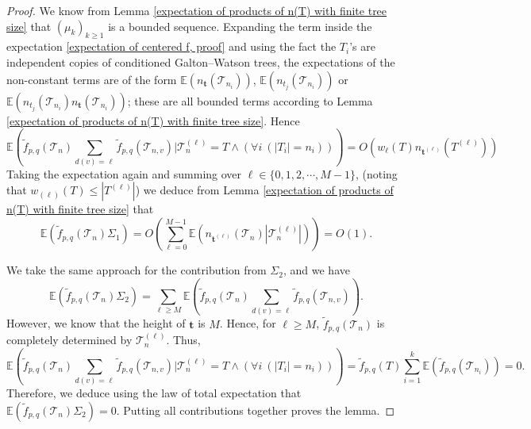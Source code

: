 \documentclass[10pt,a4paper]{amsart}
\newcommand{\E}{\mathbb{E}}
\newcommand{\hf}{\tilde{f}_{p,q}}
\newcommand{\n}{n_{\st}}
\newcommand{\st}{\textbf{t}}
\newcommand{\tc}{\mathcal{T}}
\begin{document}
\begin{proof}
We know from Lemma \ref{expectation of products of n(T) with finite tree size} that $(\mu_k)_{k\geq 1}$ is a bounded sequence.  Expanding the term inside the expectation \eqref{expectation of centered f, proof} and using the fact the $T_i$'s are independent copies of conditioned Galton--Watson trees, the expectations of the non-constant terms are of the form $\E(\n(\tc_{n_i}))$,  $\E(n_{t_j}(\tc_{n_i}))$ or $\E(n_{t_j}(\tc_{n_i})\n(\tc_{n_i}))$; these are all bounded terms according to Lemma \ref{expectation of products of n(T) with finite tree size}. Hence
\[
   \mathbb{E}\left(\hf(\tc_n)\sum_{d(v)=\ell}\hf(\tc_{n,v})\Big|\tc_n^{(\ell)}=T \wedge (\forall i \  (|T_i|=n_i))\right)=O\left(w_{\ell}(T)n_{\st^{(\ell)}}(T^{(\ell)})\right)
\]
Taking the expectation again and summing over $\ell\in \{0,1,2,\cdots, M-1\}$, (noting that $w_{(\ell)}(T)\leq |T^{(\ell)}|$) we deduce from Lemma \ref{expectation of products of n(T) with finite tree size} that 
\[
\E\left(\hf(\tc_n)\Sigma_1\right)=O\left(\sum_{\ell=0}^{M-1}\E\left(n_{\st^{(\ell)}}(\tc_n)|\tc_n^{(\ell)}|\right)\right)=O(1).
\]

We take the same approach for the contribution from $\Sigma_2$, and we have  
\[
\E\left(\hf(\tc_n)\Sigma_2\right) = \sum_{\ell\geq M}\mathbb{E}\left(\hf(\tc_n)\sum_{d(v)=\ell}\hf(\tc_{n,v})\right).
\]
However, we know that the height of $\st$ is $M$. Hence, for $\ell\geq M$, $\hf(\tc_n)$ is completely determined by $\tc_n^{(\ell)}$. Thus,
\[
\mathbb{E}\left(\hf(\tc_n)\sum_{d(v)=\ell}\hf(\tc_{n,v})\Big|\tc_n^{(\ell)}=T \wedge (\forall i \  (|T_i|=n_i) )\right)=\hf(T)\sum_{i=1}^{k}\E(\hf(\tc_{n_i}))=0.
\]
Therefore, we deduce using the law of total expectation that $\E\left(\hf(\tc_n)\Sigma_2\right)=0$. Putting all contributions together proves the lemma. 
\end{proof}
\end{document}
